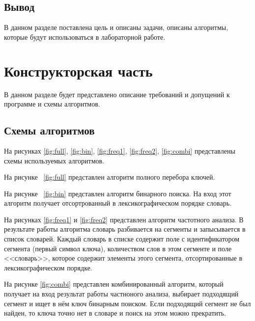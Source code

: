\documentclass[12pt]{report}
\begin{document}
\section{Вывод}
В данном разделе поставлена цель и описаны задачи, описаны алгоритмы, которые будут использоваться в лабораторной работе.
	
	
\clearpage

\chapter{Конструкторская часть}

В данном разделе будет представлено описание требований и допущений к программе и схемы алгоритмов.

\section{Схемы алгоритмов}

На рисунках \ref{fig:full}, \ref{fig:bin}, \ref{fig:freq1}, \ref{fig:freq2}, \ref{fig:combi} представлены схемы используемых алгоритмов.


На рисунке ~\ref{fig:full} представлен алгоритм полного перебора ключей.

На рисунке ~\ref{fig:bin} представлен алгоритм бинарного поиска. На вход этот алгоритм получает отсортрованный в лексикографическом порядке словарь.

На рисунках \ref{fig:freq1} и \ref{fig:freq2} представлен алгоритм частотного анализа. В результате работы алгоритма словарь разбивается на сегменты и запысывается в список словарей. Каждый словарь в списке содержит поле с идентификатором сегмента (первый символ ключа), количеством слов в этом сегменте и поле <<словарь>>, которое содержит элементы этого сегмента, отсортированные в лексикографическом порядке.

На рисунке \ref{fig:combi} представлен комбинированный алгоритм, который получает на вход результат работы частноного анализа, выбирает подходящий сегмент и ищет в нём ключ бинарным поиском. Если подходящий сегмент не был найден, то ключа точно нет в словаре и поиск на этом можно прекратить.
\end{document}
